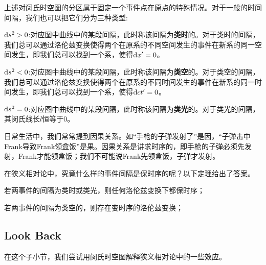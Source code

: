 上述对闵氏时空图的分区属于固定一个事件点在原点的特殊情况。对于一般的时间间隔，我们也可以把它们分为三种类型:
\begin{Itemize}
    \item $\dif s^2>0$:对应图中曲线\uppercase\expandafter{}中的某段间隔，此时称该间隔为\textbf{类时}的。对于类时的间隔，我们总可以通过洛伦兹变换使得两个在原系的不同空间发生的事件在新系的同一空间发生，即我们总可以找到一个系，使得$\dif x'=0$。
    \item $\dif s^2<0$:对应图中曲线\uppercase\expandafter{}中的某段间隔，此时称该间隔为\textbf{类空}的。对于类空的间隔，我们总可以通过洛伦兹变换使得两个在原系的不同时间发生的事件在新系的同一时间发生，即我们总可以找到一个系，使得$\dif ct'=0$。
    \item $\dif s^2=0$:对应图中曲线\uppercase\expandafter{}中的某段间隔，此时称该间隔为\textbf{类光}的。对于类光的间隔，其闵氏线长$l$恒等于$0$。
\end{Itemize}

日常生活中，我们常常提到因果关系。如``手枪的子弹发射了''是因，``子弹击中Frank导致Frank领盒饭''是果。因果关系是讲求时序的，即手枪的子弹必须先发射，Frank才能领盒饭；我们不可能说Frank先领盒饭，子弹才发射。

在狭义相对论中，究竟什么样的事件间隔是保时序的呢？以下定理给出了答案。
\begin{law}
    \begin{Itemize}
        \item 若两事件的间隔为类时或类光，则任何洛伦兹变换下都保时序；
        \item 若两事件的间隔为类空的，则存在变时序的洛伦兹变换；
    \end{Itemize}
\end{law}
\subsection[回顾]{Look Back}
在这个子小节，我们尝试用闵氏时空图解释狭义相对论中的一些效应。

